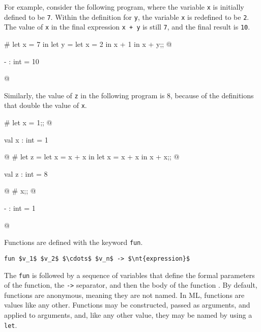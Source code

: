 For example, consider the following program, where the variable
\hbox{\lstinline/x/} is initially defined to be \hbox{\lstinline/7/}.  Within the definition for
\hbox{\lstinline/y/}, the variable \hbox{\lstinline/x/} is redefined to be \hbox{\lstinline/2/}.  The value of
\hbox{\lstinline/x/} in the final expression \hbox{\lstinline/x + y/} is still \hbox{\lstinline/7/}, and the
final result is \hbox{\lstinline/10/}.

\begin{ocaml}
# let x = 7 in
  let y =
     let x = 2 in
        x + 1
  in
     x + y;;
@
\begin{topoutput}
- : int = 10
\end{topoutput}
@
\end{ocaml}
%
Similarly, the value of \hbox{\lstinline/z/} in the following program is 8,
because of the definitions that double the value of \hbox{\lstinline/x/}.

\begin{ocaml}
# let x = 1;;
@
\begin{topoutput}
val x : int = 1
\end{topoutput}
@
# let z =
     let x = x + x in
     let x = x + x in
        x + x;;
@
\begin{topoutput}
val z : int = 8
\end{topoutput}
@
# x;;
@
\begin{topoutput}
- : int = 1
\end{topoutput}
@
\end{ocaml}

\label{keyword:fun}

Functions are defined with the keyword \texttt{fun}.

\label{keyword:->}
\begin{center}
\lstinline!fun $v_1$ $v_2$ $\cdots$ $v_n$ -> $\nt{expression}$!
\end{center}
%
The \hbox{\lstinline/fun/} is followed by a sequence of variables that define the
formal parameters of the function, the \hbox{\lstinline/->/} separator, and then
the body of the function .  By default, functions are
anonymous, meaning they are not named.  In ML, functions
are values like any other.  Functions may be constructed, passed as
arguments, and applied to arguments, and, like any other value, they
may be named by using a \hbox{\lstinline/let/}.

